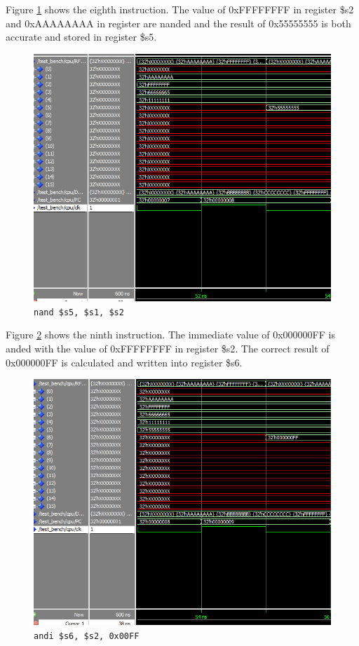 \documentclass[12pt]{article}
\begin{document}
Figure \ref{fig:8-instr} shows the eighth instruction. The value of 0xFFFFFFFF in register \$s2 and 0xAAAAAAAA in register are nanded and the result of 0x55555555 is both accurate and stored in register \$s5.
\begin{figure}[H]
\centering
\includegraphics[width=\linewidth]{simulation/8-instr}
\caption{\texttt{nand \$s5, \$s1, \$s2}}
\label{fig:8-instr}
\end{figure}


Figure \ref{fig:9-instr} shows the ninth instruction. The immediate value of 0x000000FF is anded with the value of 0xFFFFFFFF in register \$s2. The correct result of 0x000000FF is calculated and written into register \$s6.
\begin{figure}[H]
\centering
\includegraphics[width=\linewidth]{simulation/9-instr}
\caption{\texttt{andi \$s6, \$s2, 0x00FF}}
\label{fig:9-instr}
\end{figure}
\end{document}

